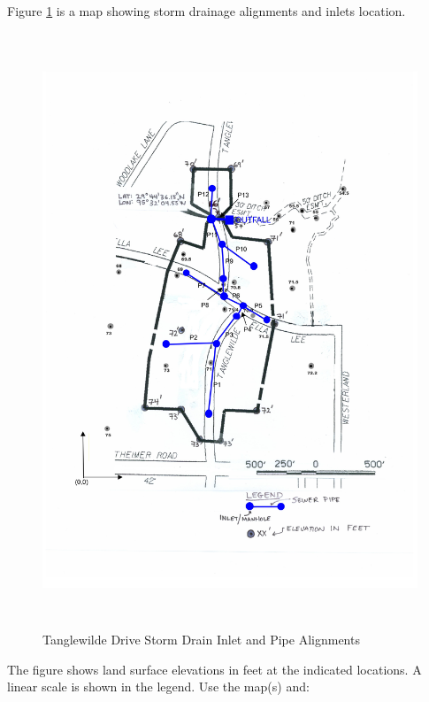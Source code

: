 \documentclass[12pt]{article}
\begin{document}
Figure \ref{fig:survey} is a map showing storm drainage alignments and inlets location.  
\begin{figure}[h!] %
   \centering
   \includegraphics[height=7in]{Image119B.jpg} 
   \caption{Tanglewilde Drive Storm Drain Inlet and Pipe Alignments}
   \label{fig:survey}
\end{figure}

The figure shows land surface elevations in feet at the indicated locations.  
A linear scale is shown in the legend.  
Use the map(s) and:
\end{document}

